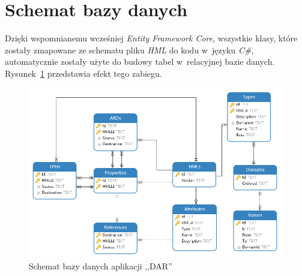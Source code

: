 \section{Schemat bazy danych}
\label{sec:schematBazyDanych}
Dzięki wspomnianemu wcześniej \emph{Entity Framework Core}, wszystkie klasy, które zostały zmapowane ze schematu pliku \emph{HML} do kodu w~języku \emph{C\#}, automatycznie zostały użyte do budowy tabel w~relacyjnej bazie danych. Rysunek~\ref{fig:databaseScheme} przedstawia efekt tego zabiegu. 
\begin{figure}
    \centering
    \includegraphics[width=\textwidth,height=0.4\textheight,keepaspectratio]{./assets/databaseScheme.png}
    \caption{Schemat bazy danych aplikacji ,,DAR''}
    \label{fig:databaseScheme}
\end{figure}

